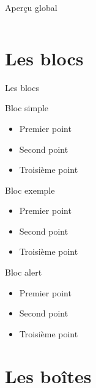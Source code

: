 \documentclass{bredelebeamer}
\begin{document}
\begin{frame}{Aperçu global}
\begin{columns}
\begin{column}{0.5\textwidth}
\end{column}

\end{columns}
\end{frame}




\section{Les blocs}

\begin{frame}{Les blocs}

\begin{block}{Bloc simple}
\begin{itemize}
\item Premier point
\item Second point
\item Troisième point
\end{itemize}
\end{block}

\begin{exampleblock}{Bloc exemple}
\begin{itemize}
\item Premier point
\item Second point
\item Troisième point
\end{itemize}
\end{exampleblock}

\begin{alertblock}{Bloc alert}
\begin{itemize}
\item Premier point
\item Second point
\item Troisième point
\end{itemize}
\end{alertblock}
\end{frame}


\section{Les bo\^ites}
\end{document}
